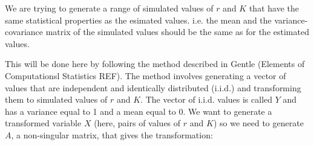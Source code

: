 \documentclass[a4paper]{article}
\begin{document}
%


We are trying to generate a range of simulated values of $r$ and $K$ that have the same statistical properties as
the esimated values. i.e. the mean and the variance-covariance matrix of the simulated values should be the same as for the estimated values.

This will be done here by following the method described in Gentle (Elements of Computationsl Statistics REF). 
The method involves generating a vector of values that are independent and identically distributed (i.i.d.) and transforming them to simulated values of $r$ and $K$.
The vector of i.i.d. values is called $Y$ and has a variance equal to 1 and a mean equal to 0.  
We want to generate a transformed variable $X$ (here, pairs of values of $r$ and $K$) so we need to generate $A$, a non-singular matrix, that gives the transformation:
\end{document}
